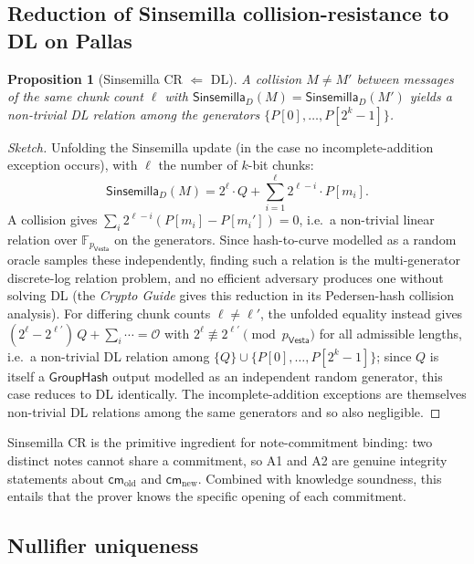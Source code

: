 \documentclass[11pt,a4paper]{article}
\newtheorem{proposition}[theorem]{Proposition}
\theoremstyle{definition}
\newcommand{\F}{\mathbb{F}}
\newcommand{\cmsym}{\mathsf{cm}}
\newcommand{\Vesta}{\ensuremath{\mathsf{Vesta}}}
\newcommand{\Sinsemilla}{\ensuremath{\mathsf{Sinsemilla}}}
\newcommand{\GroupHash}{\ensuremath{\mathsf{GroupHash}}}
\begin{document}
\subsection{Reduction of Sinsemilla collision-resistance to DL on Pallas}\label{sec:sins-cr}

\begin{proposition}[Sinsemilla CR $\Leftarrow$ DL]\label{prop:sins-cr}
A collision $M \ne M'$ between messages of the same chunk count $\ell$
with $\Sinsemilla_D(M) = \Sinsemilla_D(M')$
yields a non-trivial DL relation among the generators
$\{P[0], \dots, P[2^k - 1]\}$.
\end{proposition}

\begin{proof}[Sketch]
Unfolding the Sinsemilla update (in the case no incomplete-addition
exception occurs), with $\ell$ the number of $k$-bit chunks:
\[
\Sinsemilla_D(M) = 2^\ell \cdot Q + \sum_{i=1}^{\ell} 2^{\ell - i} \cdot P[m_i].
\]
A collision gives $\sum_i 2^{\ell-i}(P[m_i] - P[m_i']) = 0$, i.e.\ a
non-trivial linear relation over $\F_{p_{\Vesta}}$ on the generators. Since
hash-to-curve modelled as a random oracle samples these independently,
finding such a relation is the multi-generator discrete-log relation
problem, and no efficient adversary produces one without solving DL (the
\emph{Crypto Guide} gives this reduction in its Pedersen-hash collision
analysis). For differing chunk counts $\ell \ne \ell'$, the unfolded
equality instead gives $(2^{\ell} - 2^{\ell'})\,Q + \sum_i \cdots =
\mathcal{O}$ with $2^{\ell} \not\equiv 2^{\ell'} \pmod{p_{\Vesta}}$ for all
admissible lengths, i.e.\ a non-trivial DL relation among $\{Q\} \cup
\{P[0], \dots, P[2^k - 1]\}$; since $Q$ is itself a $\GroupHash$ output
modelled as an independent random generator, this case reduces to DL
identically. The incomplete-addition exceptions are themselves
non-trivial DL relations among the same generators and so also
negligible.
\end{proof}

Sinsemilla CR is the primitive ingredient for note-commitment binding:
two distinct notes cannot share a commitment, so A1 and A2 are
genuine integrity statements about $\cmsym_{\mathrm{old}}$ and
$\cmsym_{\mathrm{new}}$. Combined with knowledge soundness, this entails
that the prover knows the specific opening of each commitment.

\subsection{Nullifier uniqueness}\label{sec:nf-unique}
\end{document}
